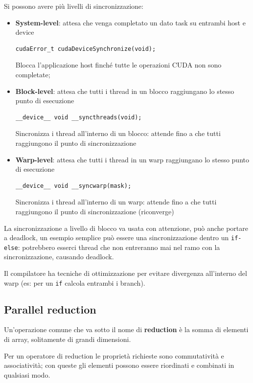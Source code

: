 Si possono avere più livelli di sincronizzazione:
\begin{itemize}
	\item \textbf{System-level}: attesa che venga completato un dato task su entrambi host e device
	\begin{verbatim}
cudaError_t cudaDeviceSynchronize(void);
	\end{verbatim}
	Blocca l'applicazione host finché tutte le operazioni CUDA non sono completate;
	
	\item \textbf{Block-level}: attesa che tutti i thread in un blocco raggiungano lo stesso punto di esecuzione
	\begin{verbatim}
__device__ void __syncthreads(void);
	\end{verbatim}
	Sincronizza i thread all'interno di un blocco: attende fino a che tutti raggiungono il punto di sincronizzazione
	
	\item \textbf{Warp-level}: attesa che tutti i thread in un warp raggiungano lo stesso punto di esecuzione
	\begin{verbatim}
__device__ void __syncwarp(mask);
	\end{verbatim}
	Sincronizza i thread all'interno di un warp: attende fino a che tutti raggiungono il punto di sincronizzazione (riconverge)
\end{itemize}

La sincronizzazione a livello di blocco va usata con attenzione, può anche portare a deadlock, un esempio semplice può essere una sincronizzazione dentro un \texttt{if-else}: potrebbero esserci thread che non entreranno mai nel ramo con la sincronizzazione, causando deadlock.

Il compilatore ha tecniche di ottimizzazione per evitare divergenza all'interno del warp (es: per un \texttt{if} calcola entrambi i branch).

\subsection{Parallel reduction}

Un'operazione comune che va sotto il nome di \textbf{reduction} è la somma di elementi di array, solitamente di grandi dimensioni. 

Per un operatore di reduction le proprietà richieste sono commutatività e associatività; con queste gli elementi possono essere riordinati e combinati in qualsiasi modo.

